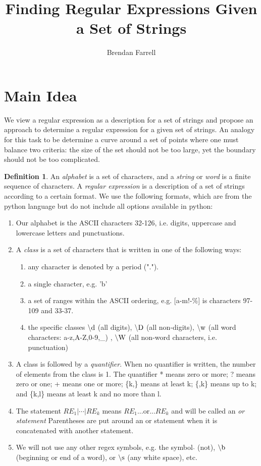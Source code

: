 \documentclass[11pt, oneside]{article}   	%
\title{Finding Regular Expressions Given a Set of Strings}
\author{Brendan Farrell}
\theoremstyle{definition}
\newtheorem{definition}{Definition}
\newcommand{\dre}{$\backslash \textnormal{d}$ }
\newcommand{\D}{$\backslash \textnormal{D}$ }
\newcommand{\w}{$\backslash \textnormal{w}$ }
\newcommand{\W}{$\backslash \textnormal{W}$ }
\begin{document}
\maketitle

\section{Main Idea}

We view a regular expression as a description for a set of strings and propose an approach to determine a regular expression for a given set of strings. 
An analogy for this task to be determine a curve around a set of points where one must balance two criteria: the size of the set should not be too large, yet the boundary should not be too complicated. 


\begin{definition}
An \textit{alphabet} is a set of characters, and a \textit{string} or \textit{word} is a finite sequence of characters. A \textit{regular expression} is a description of a set of strings according to a certain format. We use the following formats, which are from the python language but do not include all options available in python:
\begin{enumerate}
    \item Our alphabet is the ASCII characters 32-126, i.e. digits, uppercase and lowercase letters and punctuations. 
    \item A \textit{class} is a set of characters that is written in one of the following ways:
   \begin{enumerate}
   \item any character is denoted by a period (".").
   \item a single character, e.g. 'b'
   \item a set of ranges within the ASCII ordering, e.g. [a-m!-\%] is characters 97-109 and 33-37.
   \item the specific classes  \dre (all digits), \D (all non-digits), \w (all word characters: a-z,A-Z,0-9,\_) , \W (all non-word characters, i.e. punctuation)
   \end{enumerate}
   \item A class is followed by a \textit{quantifier}. When no quantifier is written, the number of elements from the class is 1. The quantifier * means zero or more; ? means zero or one; + means one or more; \{k,\} means at least k; \{,k\} means up to k; and \{k,l\} means at least k and no more than l.
   \item The statement $RE_1|\cdots |RE_k$ means  $RE_1$...or...$RE_k$ and will be called an \textit{or statement} Parentheses are put around an or statement when it is concatenated with another statement.
   \item We will not use any other regex symbols, e.g. the symbol $\hat{}$ (not), $\backslash \textnormal{b}$ (beginning or end of a word),  or $\backslash \textnormal{s}$ (any white space), etc.
\end{enumerate}
\end{definition}
\end{document}
